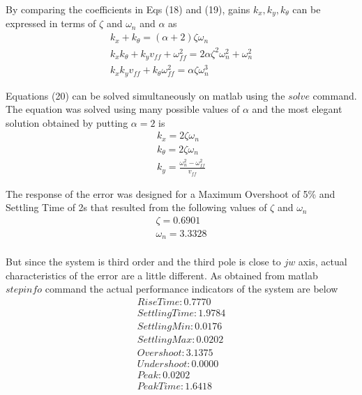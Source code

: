 \documentclass[conference]{IEEEtran}
\begin{document}
By comparing the coefficients in Eqs (18) and (19), gains $k_{x}, k_{y}, k_{\theta}$ can be expressed in terms of $\zeta$ and $\omega_{n}$ and $\alpha$ as
\begin{equation}\label{eq}
\begin{split}
k_{x}+k_{\theta}= (\alpha+2)\zeta\omega_{n}\\
k_{x}k_{\theta}+k_{y}v_{ff}+\omega_{ff}^2= 2\alpha\zeta^2\omega_{n}^2+\omega_{n}^2\\
k_{x}k_{y}v_{ff}+k_{\theta}\omega_{ff}^2= \alpha\zeta\omega_{n}^3
\end{split}
\end{equation}

Equations (20) can be solved simultaneously on matlab using the $solve$ command. The equation was solved using many possible values of $\alpha$ and the most elegant solution obtained by putting $\alpha = 2$ is
\begin{equation}\label{eq}
\begin{split}
k_{x} = 2\zeta\omega_{n} \\
k_{\theta} = 2\zeta\omega_{n} \\
k_{y} = \frac{\omega_{n}^2-\omega_{ff}^2}{v_{ff}}
\end{split}
\end{equation}

The response of the error was designed for a Maximum Overshoot of 5\% and Settling Time of 2s that resulted from the following values of $\zeta$ and $\omega_{n}$
\begin{equation}\label{eq}
\begin{split}
\zeta = 0.6901 \\
\omega_{n} = 3.3328 \\
\end{split}
\end{equation}

But since the system is third order and the third pole is close to $jw$ axis, actual characteristics of the error are a little different. As obtained from matlab $stepinfo$ command the actual performance indicators of the system are below
\begin{equation}
\begin{split}
RiseTime: 0.7770 \\
SettlingTime: 1.9784 \\
SettlingMin: 0.0176 \\
SettlingMax: 0.0202 \\
Overshoot: 3.1375 \\
Undershoot: 0.0000 \\
Peak: 0.0202 \\
PeakTime: 1.6418
\end{split}
\end{equation}
\end{document}
